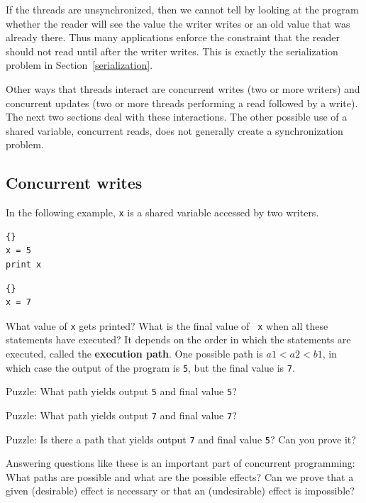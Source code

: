 \documentclass{book}
\begin{document}
If the threads are unsynchronized, then we cannot tell by looking at
the program whether the reader will see the value the writer writes
or an old value that was already there.
Thus many applications enforce the constraint that the reader
should not read until after the writer writes.  This is exactly
the serialization problem in Section~\ref{serialization}.

Other ways that threads interact are
concurrent writes (two or more writers) and concurrent updates
(two or more threads performing a read followed by a write).
The next two sections deal with these interactions.  The other
possible use of a shared variable, concurrent
reads, does not generally create a synchronization problem.


\subsection {Concurrent writes}

In the following example, {\tt x} is a shared variable accessed
by two writers.

\begin{minipage}[t]{2in}
\begin{lstlisting}[title={Thread A}]{}
x = 5
print x
\end{lstlisting}
\end{minipage}
\hfill
\begin{minipage}[t]{2in}
\begin{lstlisting}[title={Thread B}]{}
x = 7
\end{lstlisting}
\end{minipage}

What value of {\tt x} gets printed?  What is the final value of {\tt
x} when all these statements have executed?  It depends on the order
in which the statements are executed, called the {\bf execution path}.
One possible path is $a1 < a2 < b1$, in which case the output of the
program is {\tt 5}, but the final value is {\tt 7}.

Puzzle: What path yields output {\tt 5} and final
value {\tt 5}?

Puzzle: What path yields output {\tt 7} and final
value {\tt 7}?

Puzzle: Is there a path that yields output {\tt 7} and final
value {\tt 5}?  Can you prove it?

Answering questions like these is an important part of concurrent
programming:  What paths are possible and what are the
possible effects?  Can we prove that a given (desirable) effect is
necessary or that an (undesirable) effect is impossible?
\end{document}

